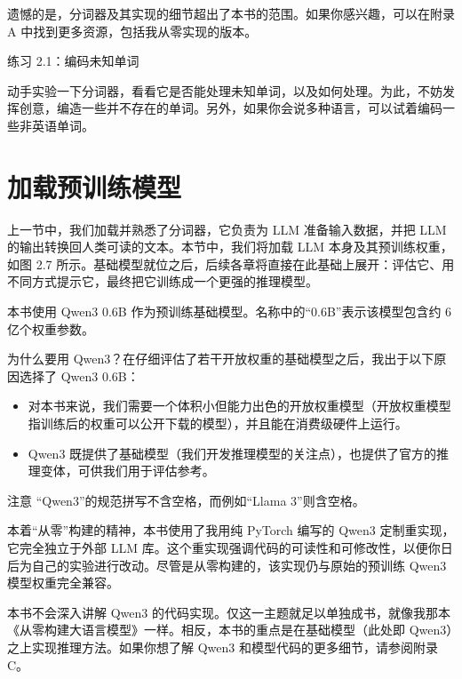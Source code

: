 遗憾的是，分词器及其实现的细节超出了本书的范围。如果你感兴趣，可以在附录 A 中找到更多资源，包括我从零实现的版本。

\begin{mySidebar}{练习 2.1：编码未知单词}

动手实验一下分词器，看看它是否能处理未知单词，以及如何处理。为此，不妨发挥创意，编造一些并不存在的单词。另外，如果你会说多种语言，可以试着编码一些非英语单词。

\end{mySidebar}

\section{加载预训练模型}

上一节中，我们加载并熟悉了分词器，它负责为 LLM 准备输入数据，并把 LLM 的输出转换回人类可读的文本。本节中，我们将加载 LLM 本身及其预训练权重，如图 2.7 所示。基础模型就位之后，后续各章将直接在此基础上展开：评估它、用不同方式提示它，最终把它训练成一个更强的推理模型。


本书使用 Qwen3 0.6B 作为预训练基础模型。名称中的“0.6B”表示该模型包含约 6 亿个权重参数。

为什么要用 Qwen3？在仔细评估了若干开放权重的基础模型之后，我出于以下原因选择了 Qwen3 0.6B：

\begin{itemize}
\item 对本书来说，我们需要一个体积小但能力出色的开放权重模型（开放权重模型指训练后的权重可以公开下载的模型），并且能在消费级硬件上运行。
\item Qwen3 既提供了基础模型（我们开发推理模型的关注点），也提供了官方的推理变体，可供我们用于评估参考。
\end{itemize}

\begin{myWarning}{注意}
 “Qwen3”的规范拼写不含空格，而例如“Llama 3”则含空格。\end{myWarning}

本着“从零”构建的精神，本书使用了我用纯 PyTorch 编写的 Qwen3 定制重实现，它完全独立于外部 LLM 库。这个重实现强调代码的可读性和可修改性，以便你日后为自己的实验进行改动。尽管是从零构建的，该实现仍与原始的预训练 Qwen3 模型权重完全兼容。

本书不会深入讲解 Qwen3 的代码实现。仅这一主题就足以单独成书，就像我那本《从零构建大语言模型》一样。相反，本书的重点是在基础模型（此处即 Qwen3）之上实现推理方法。如果你想了解 Qwen3 和模型代码的更多细节，请参阅附录 C。

